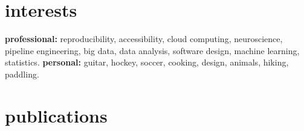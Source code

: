 \documentclass[]{friggeri-cv} %
\begin{document}

\vspace{9pt}
\section{interests}

\textbf{professional:} reproducibility, accessibility, cloud computing, neuroscience, pipeline engineering, big data,
data analysis, software design, machine learning, statistics.
\textbf{personal:} guitar, hockey, soccer, cooking, design, animals, hiking, paddling.

\section{publications}







\end{document}

